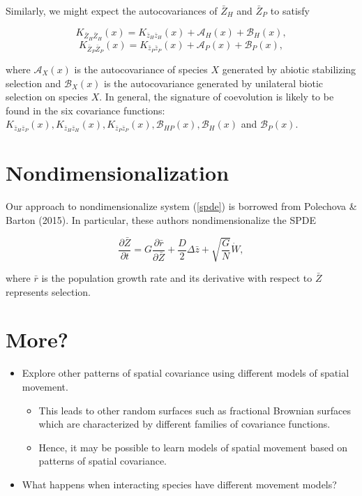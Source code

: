 \documentclass{article}
\begin{document}
Similarly, we might expect the autocovariances of \(\bar Z_H\) and
\(\bar Z_P\) to satisfy

\begin{equation}
  K_{\bar Z_H\bar Z_H}(x)=K_{\bar z_H\bar z_H}(x)+\mathcal{A}_H(x)+\mathcal B_H(x),
\end{equation} \begin{equation}
  K_{\bar Z_P\bar Z_P}(x)=K_{\bar z_P\bar z_P}(x)+\mathcal{A}_P(x)+\mathcal B_P(x),
\end{equation}

where \(\mathcal{A}_X(x)\) is the autocovariance of species \(X\)
generated by abiotic stabilizing selection and \(\mathcal{B}_X(x)\) is
the autocovariance generated by unilateral biotic selection on species
\(X\). In general, the signature of coevolution is likely to be found in
the six covariance functions:
\(K_{\bar z_H\bar z_P}(x),K_{\bar z_H\bar z_H}(x),K_{\bar z_P\bar z_P}(x),\mathcal B_{HP}(x),\mathcal B_H(x)\)
and \(\mathcal B_P(x)\).

\hypertarget{nondimensionalization}{%
\section{Nondimensionalization}\label{nondimensionalization}}

Our approach to nondimensionalize system (\ref{spde}) is borrowed from
Polechova \& Barton (2015). In particular, these authors
nondimensionalize the SPDE

\[\frac{\partial\bar Z}{\partial t}=G\frac{\partial\bar r}{\partial\bar Z}+\frac{D}{2}\Delta\bar z+\sqrt{\frac{G}{N}}\dot W,\]

where \(\bar r\) is the population growth rate and its derivative with
respect to \(\bar Z\) represents selection.

\hypertarget{more}{%
\section{More?}\label{more}}

\begin{itemize}
\tightlist
\item
  Explore other patterns of spatial covariance using different models of
  spatial movement.

  \begin{itemize}
  \tightlist
  \item
    This leads to other random surfaces such as fractional Brownian
    surfaces which are characterized by different families of covariance
    functions.
  \item
    Hence, it may be possible to learn models of spatial movement based
    on patterns of spatial covariance.
  \end{itemize}
\item
  What happens when interacting species have different movement models?
\end{itemize}
\end{document}
